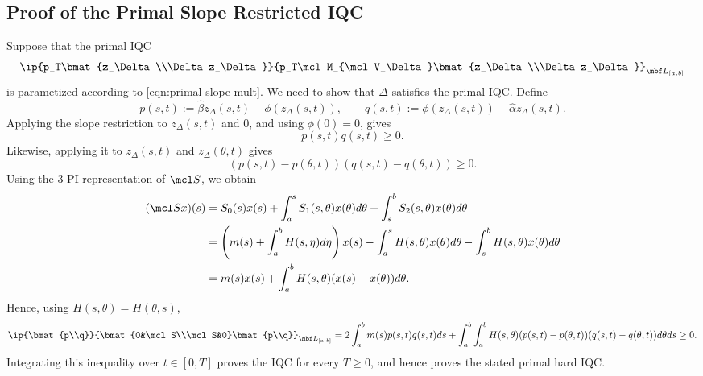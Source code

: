 \subsection{Proof of the Primal Slope Restricted IQC}
\label{proof:primal-slope}
Suppose that the primal IQC
\begin{equation*}
    \ip{p_T\bmat{z_\Delta\\\Delta z_\Delta}}
    {p_T\mcl M_{\mcl V_\Delta}\bmat{z_\Delta\\\Delta z_\Delta}}
    _{\mbf L_{[a,b]}}
\end{equation*}
is parametized according to \eqref{eqn:primal-slope-mult}. We need to show
that $\Delta$ satisfies the primal IQC.
Define
\begin{equation*}
    p(s,t):=\hat\beta z_\Delta(s,t)-\phi(z_\Delta(s,t)),\qquad
    q(s,t):=\phi(z_\Delta(s,t))-\hat\alpha z_\Delta(s,t).
\end{equation*}
Applying the slope restriction to $z_\Delta(s,t)$ and $0$, and using
$\phi(0)=0$, gives
\begin{equation*}
    p(s,t)q(s,t)\geq0.
\end{equation*}
Likewise, applying it to $z_\Delta(s,t)$ and $z_\Delta(\theta,t)$ gives
\begin{equation*}
    (p(s,t)-p(\theta,t))(q(s,t)-q(\theta,t))\geq0.
\end{equation*}
Using the 3-PI representation of $\mcl S$, we obtain
\begin{align*}
(\mcl Sx)(s)
&=S_0(s)x(s)+\int_a^sS_1(s,\theta)x(\theta)d\theta
+\int_s^bS_2(s,\theta)x(\theta)d\theta\\
&=\left(m(s)+\int_a^bH(s,\eta)d\eta\right)x(s)
-\int_a^sH(s,\theta)x(\theta)d\theta
-\int_s^bH(s,\theta)x(\theta)d\theta\\
&=m(s)x(s)+\int_a^bH(s,\theta)(x(s)-x(\theta))d\theta.
\end{align*}
Hence, using $H(s,\theta)=H(\theta,s)$,
\begin{equation*}
\ip{\bmat{p\\q}}
{\bmat{0&\mcl S\\\mcl S&0}\bmat{p\\q}}_{\mbf L_{[a,b]}}=2\int_a^b m(s)p(s,t)q(s,t)ds+\int_a^b\int_a^bH(s,\theta)
(p(s,t)-p(\theta,t))(q(s,t)-q(\theta,t))d\theta ds\geq0.
\end{equation*}
Integrating this inequality over $t\in[0,T]$ proves the IQC for every
$T\geq0$, and hence proves the stated primal hard IQC.

